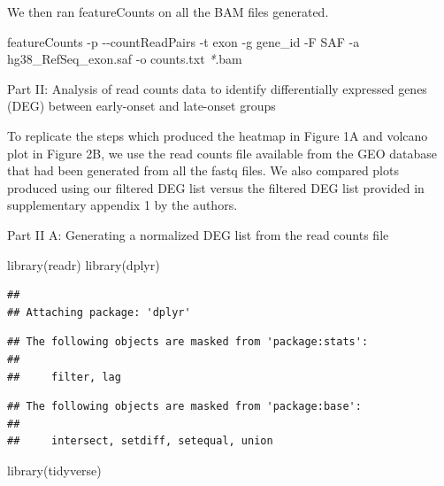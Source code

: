 \documentclass[
]{article}
\newenvironment{Shaded}{\begin{snugshade}}{\end{snugshade}}
\newcommand{\AttributeTok}[1]{\textcolor[rgb]{0.77,0.63,0.00}{#1}}
\newcommand{\ExtensionTok}[1]{#1}
\newcommand{\FunctionTok}[1]{\textcolor[rgb]{0.00,0.00,0.00}{#1}}
\newcommand{\NormalTok}[1]{#1}
\newcommand{\PreprocessorTok}[1]{\textcolor[rgb]{0.56,0.35,0.01}{\textit{#1}}}
\newcommand{\StringTok}[1]{\textcolor[rgb]{0.31,0.60,0.02}{#1}}
\begin{document}
We then ran featureCounts on all the BAM files generated.

\begin{Shaded}
\begin{Highlighting}[]
\ExtensionTok{featureCounts} \AttributeTok{{-}p} \AttributeTok{{-}{-}countReadPairs} \AttributeTok{{-}t}\NormalTok{ exon }\AttributeTok{{-}g}\NormalTok{ gene\_id }\AttributeTok{{-}F} \StringTok{\textquotesingle{}SAF\textquotesingle{}} \AttributeTok{{-}a}\NormalTok{ hg38\_RefSeq\_exon.saf }\AttributeTok{{-}o}\NormalTok{ counts.txt }\PreprocessorTok{*}\NormalTok{.bam}
\end{Highlighting}
\end{Shaded}

Part II: Analysis of read counts data to identify differentially
expressed genes (DEG) between early-onset and late-onset groups

To replicate the steps which produced the heatmap in Figure 1A and
volcano plot in Figure 2B, we use the read counts file available from
the GEO database that had been generated from all the fastq files. We
also compared plots produced using our filtered DEG list versus the
filtered DEG list provided in supplementary appendix 1 by the authors.

Part II A: Generating a normalized DEG list from the read counts file

\begin{Shaded}
\begin{Highlighting}[]
\FunctionTok{library}\NormalTok{(readr)}
\FunctionTok{library}\NormalTok{(dplyr)}
\end{Highlighting}
\end{Shaded}

\begin{verbatim}
## 
## Attaching package: 'dplyr'
\end{verbatim}

\begin{verbatim}
## The following objects are masked from 'package:stats':
## 
##     filter, lag
\end{verbatim}

\begin{verbatim}
## The following objects are masked from 'package:base':
## 
##     intersect, setdiff, setequal, union
\end{verbatim}

\begin{Shaded}
\begin{Highlighting}[]
\FunctionTok{library}\NormalTok{(tidyverse)}
\end{Highlighting}
\end{Shaded}
\end{document}

